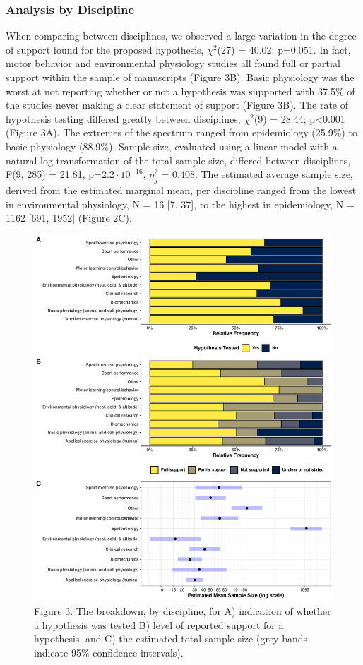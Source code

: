 \documentclass[]{cik}%
\begin{document}
\newpage

\hypertarget{analysis-by-discipline}{%
\subsubsection{Analysis by Discipline}\label{analysis-by-discipline}}

When comparing between disciplines, we observed a large variation in the
degree of support found for the proposed hypothesis, \(\chi^2\)(27) =
40.02; p=0.051. In fact, motor behavior and environmental physiology
studies all found full or partial support within the sample of
manuscripts (Figure 3B). Basic physiology was the worst at not reporting
whether or not a hypothesis was supported with 37.5\% of the studies
never making a clear statement of support (Figure 3B). The rate of
hypothesis testing differed greatly between disciplines, \(\chi^2\)(9) =
28.44; p\textless0.001 (Figure 3A). The extremes of the spectrum ranged
from epidemiology (25.9\%) to basic physiology (88.9\%). Sample size,
evaluated using a linear model with a natural log transformation of the
total sample size, differed between disciplines, F(9, 285) = 21.81,
p=\(2.2 \cdot 10^{-16}\), \(\eta^2_g\) = 0.408. The estimated average
sample size, derived from the estimated marginal mean, per discipline
ranged from the lowest in environmental physiology, N = 16 {[}7, 37{]},
to the highest in epidemiology, N = 1162 {[}691, 1952{]} (Figure 2C).

\newpage

\begin{figure}[H]
\includegraphics[width=0.9\linewidth]{figure3} \caption{Figure 3. The breakdown, by discipline, for A) indication of whether a hypothesis was tested B) level of reported support for a hypothesis,  and C) the estimated total sample size (grey bands indicate 95\% confidence intervals).}\label{fig:fig3}
\end{figure}
\end{document}
